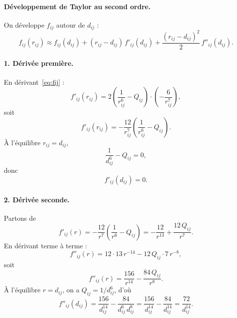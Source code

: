\documentclass[11pt,a4paper]{article}
\theoremstyle{definition}
\theoremstyle{remark}
\begin{document}
\paragraph{Développement de Taylor au second ordre.}
On développe $f_{ij}$ autour de $d_{ij}$ :
\begin{equation}
  f_{ij}(r_{ij})
  \approx
  f_{ij}(d_{ij})
  +
  (r_{ij}-d_{ij})\,f'_{ij}(d_{ij})
  +
  \frac{(r_{ij}-d_{ij})^2}{2}\,f''_{ij}(d_{ij}).
  \label{eq:taylor-dev}
\end{equation}

\paragraph{1. Dérivée première.}
En dérivant~\eqref{eq:fij} :
\begin{equation}
  f'_{ij}(r_{ij})
  =
  2
  \left(
    \frac{1}{r_{ij}^6}
    - Q_{ij}
  \right)
  \cdot
  \left(
    -\frac{6}{r_{ij}^7}
  \right),
\end{equation}
soit
\begin{equation}
  f'_{ij}(r_{ij})
  =
  -\frac{12}{r_{ij}^7}
  \left(
    \frac{1}{r_{ij}^6}
    - Q_{ij}
  \right).
\end{equation}
À l'équilibre $r_{ij}=d_{ij}$,
\begin{equation}
  \frac{1}{d_{ij}^6}
  - Q_{ij}
  =
  0,
\end{equation}
donc
\begin{equation}
  f'_{ij}(d_{ij})
  =
  0.
\end{equation}

\paragraph{2. Dérivée seconde.}
Partons de
\begin{equation}
  f'_{ij}(r)
  =
  -\frac{12}{r^7}
  \left(
    \frac{1}{r^6}
    - Q_{ij}
  \right)
  =
  -\frac{12}{r^{13}}
  +
  \frac{12\,Q_{ij}}{r^7}.
\end{equation}
En dérivant terme à terme :
\begin{equation}
  f''_{ij}(r)
  =
  12\cdot 13\,r^{-14}
  -
  12\,Q_{ij}\cdot 7\,r^{-8},
\end{equation}
soit
\begin{equation}
  f''_{ij}(r)
  =
  \frac{156}{r^{14}}
  -
  \frac{84\,Q_{ij}}{r^{8}}.
\end{equation}
À l'équilibre $r=d_{ij}$, on a $Q_{ij}=1/d_{ij}^6$, d'où
\begin{equation}
  f''_{ij}(d_{ij})
  =
  \frac{156}{d_{ij}^{14}}
  -
  \frac{84}{d_{ij}^{6}\,d_{ij}^{8}}
  =
  \frac{156}{d_{ij}^{14}}
  -
  \frac{84}{d_{ij}^{14}}
  =
  \frac{72}{d_{ij}^{14}}.
\end{equation}
\end{document}
